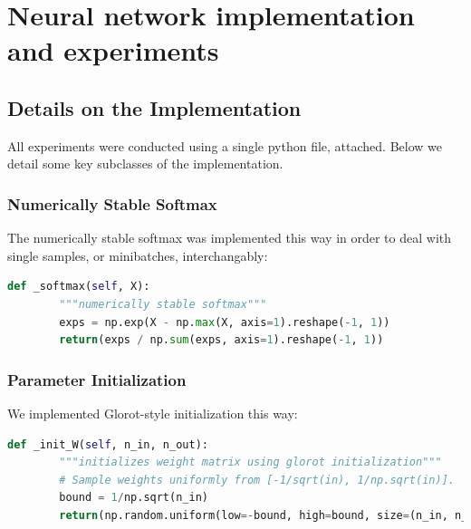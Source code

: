 \documentclass[reqno]{amsart}
\theoremstyle{definition}
\theoremstyle{remark}
\numberwithin{equation}{section}
\begin{document}
\section{Neural network implementation and experiments}

\subsection{Details on the Implementation}

All experiments were conducted using a single python file, attached. Below we detail some key subclasses of the implementation. \\

\subsubsection{Numerically Stable Softmax}

The numerically stable softmax was implemented this way in order to deal with single samples, or minibatches, interchangably: \\

\begin{lstlisting}[language=Python]
    def _softmax(self, X):                                                      
        """numerically stable softmax"""                                        
        exps = np.exp(X - np.max(X, axis=1).reshape(-1, 1))                     
        return(exps / np.sum(exps, axis=1).reshape(-1, 1)) 
\end{lstlisting}

\subsubsection{Parameter Initialization}

We implemented Glorot-style initialization this way: \\

\begin{lstlisting}[language=Python]
    def _init_W(self, n_in, n_out):                                             
        """initializes weight matrix using glorot initialization"""             
        # Sample weights uniformly from [-1/sqrt(in), 1/np.sqrt(in)].           
        bound = 1/np.sqrt(n_in)                                                 
        return(np.random.uniform(low=-bound, high=bound, size=(n_in, n_out)))   
\end{lstlisting}
\end{document}
